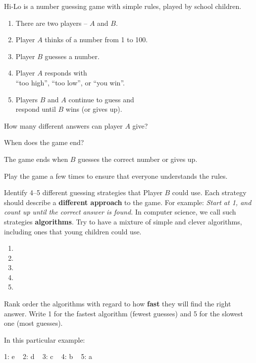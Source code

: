 
Hi-Lo is a number guessing game with simple rules, played by school children.
\begin{enumerate}[nosep]
\item There are two players -- $A$ and $B$.
\item Player $A$ thinks of a number from 1 to 100.
\item Player $B$ guesses a number.
\item Player $A$ responds with \\ ``too high'', ``too low'', or ``you win''.
\item Players $B$ and $A$ continue to guess and \\ respond until $B$ wins (or gives up).
\end{enumerate}


\Q How many different answers can player $A$ give? 

\vspace{1ex}

\Q When does the game end?

\begin{answer}[1em]
The game ends when $B$ guesses the correct number or gives up.
\end{answer}


\Q Play the game a few times to ensure that everyone understands the rules.

\vspace{1ex}


\Q Identify 4--5 different guessing strategies that Player $B$ could use.
Each strategy should describe a \textbf{different approach} to the game.
For example: \textit{Start at 1, and count up until the correct answer is found.}
In computer science, we call such strategies \textbf{algorithms}.
Try to have a mixture of simple and clever algorithms, including ones that young children could use.

\begin{enumerate}
\item {}
\item {}
\item {}
\item {}
\item {}
\end{enumerate}


\Q Rank order the algorithms with regard to how \textbf{fast} they will find the right answer.
Write 1 for the fastest algorithm (fewest guesses) and 5 for the slowest one (most guesses).

\begin{answer}
In this particular example:

1: e ~ 2: d ~ 3: c ~ 4: b ~ 5: a
\end{answer}
